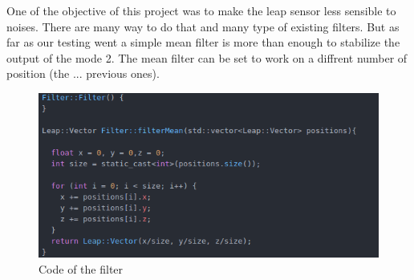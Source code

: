 One of the objective of this project was to make the leap sensor less sensible to noises. There are many way to do that and many type of existing filters. But as far as our testing went a simple mean filter is more than enough to stabilize the output of the mode 2. The mean filter can be set to work on a diffrent number of position (the ... previous ones).

\begin{figure}[H]
	\includegraphics[scale = 0.5]{codeFilter}
	\centering
	\caption{Code of the filter}
	\label{fig:letter}
\end{figure}
